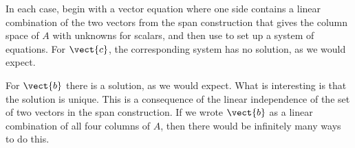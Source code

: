 In each case, begin with a vector equation where one side contains a linear combination of the two vectors from the span construction that gives the column space of $A$ with unknowns for scalars, and then use  to set up a system of equations.  For $\vect{c}$, the corresponding system has no solution, as we would expect.\par
%
For $\vect{b}$ there is a solution, as we would expect.  What is interesting is that the solution is unique.  This is a consequence of the linear independence of the set of two vectors in the span construction.  If we wrote $\vect{b}$ as a linear combination of all four columns of $A$, then there would be infinitely many ways to do this.